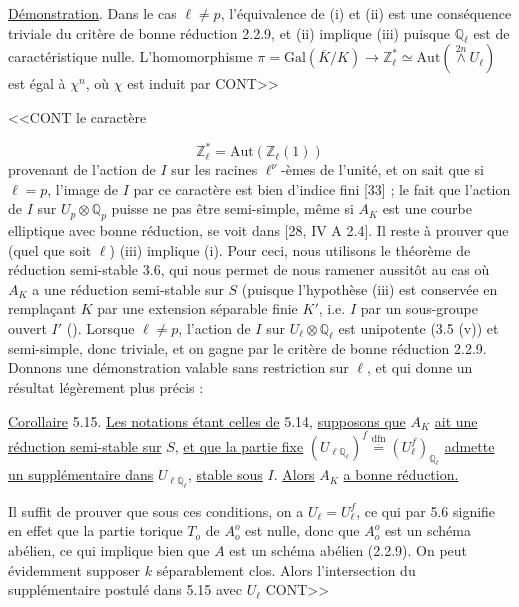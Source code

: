 \underline{Démonstration}. Dans le cas $\ell \neq p$, l'équivalence de (i) et (ii) est une conséquence triviale du critère de bonne réduction 2.2.9, et (ii) implique (iii) puisque $\mathbb{Q}_\ell$ est de caractéristique nulle. L'homomorphisme $\pi = \mathrm{Gal}(\overline{K}/K) \longrightarrow \mathbb{Z}^*_\ell \simeq \mathrm{Aut}(\stackrel{2n}{\wedge} U_\ell)$ est égal à $\chi^n$, où $\chi$ est induit par CONT>>



<<CONT le caractère

\begin{equation*}
\mathbb{Z}_\ell^{*} = \mathrm{Aut}(\mathbb{Z}_\ell(1))
\end{equation*}
provenant de l'action de $I$ sur les racines $\ell^\nu$-èmes de l'unité, et on sait que si $\ell = p$, l'image de $I$ par ce caractère est bien d'indice fini [33] ; le fait que l'action de $I$ sur $U_p \otimes \mathbb{Q}_p$ puisse ne pas être semi-simple, même si $A_K$ est une courbe elliptique avec bonne réduction, se voit dans [28, IV A 2.4]. Il reste à prouver que (quel que soit $\ell$) (iii) implique (i). Pour ceci, nous utilisons le théorème de réduction semi-stable 3.6, qui nous permet de nous ramener aussitôt au cas où $A_K$ a une réduction semi-stable sur $S$ (puisque l'hypothèse (iii) est conservée en remplaçant $K$ par une extension séparable finie $K'$, i.e. $I$ par un sous-groupe ouvert $I'$ (\quad\quad ). Lorsque $\ell \neq p$, l'action de $I$ sur $U_\ell \otimes \mathbb{Q}_\ell$ est unipotente (3.5 (v)) et semi-simple, donc triviale, et on gagne par le critère de bonne réduction 2.2.9. Donnons une démonstration valable sans restriction sur $\ell$, et qui donne un résultat légèrement plus précis :

\underline{Corollaire} 5.15. \underline{Les notations étant celles de} 5.14, \underline{supposons que} $A_K$ \underline{ait une réduction semi-stable sur} $S$, \underline{et que la partie fixe} $(U_{\ell\mathbb{Q}_\ell})^f \stackrel{\underline{\mathrm{dfn}}}{=} (U_\ell^f)_{\mathbb{Q}_\ell}$ \underline{admette un supplémentaire dans} $U_{\ell\mathbb{Q}_\ell}$, \underline{stable sous} $I$. \underline{Alors} $A_K$ \underline{a bonne réduction.}

Il suffit de prouver que sous ces conditions, on a $U_\ell = U_\ell^f$, ce qui par 5.6 signifie en effet que la partie torique $T_o$ de $A_o^o$ est nulle, donc que $A_o^o$ est un schéma abélien, ce qui implique bien que $A$ est un schéma abélien (2.2.9). On peut évidemment supposer $k$ séparablement clos. Alors l'intersection du supplémentaire postulé dans 5.15 avec $U_\ell$ CONT>>


